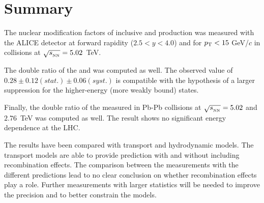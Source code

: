 \section{Summary}

The nuclear modification factors of inclusive \upsis and \upsiss production was measured with the ALICE detector at forward rapidity ($2.5<y<4.0$) and for $p_{\rm T}<15$ GeV/$c$ in \pbpb collisions at $\sqrt{s_{_{\rm NN}}}=5.02$~\rm{TeV}.

The double ratio of the \upsis and \upsiss \raa was computed as well. 
The observed value of $ 0.28 \pm 0.12(stat.) \pm 0.06(syst.)$ is compatible with the hypothesis of a larger suppression for the higher-energy (more weakly bound) states.

Finally, the double ratio of the \upsi \raa measured in Pb-Pb collisions at $\sqrt{s_{_{\rm NN}}}=5.02$ and $2.76$~\rm{TeV} was computed as well. 
The result shows no significant energy dependence at the LHC.


The results have been compared with transport and hydrodynamic models.
The transport models are able to provide prediction with and without including recombination effects.
The comparison between the measurements with the different predictions lead to no clear conclusion on whether recombination effects play a role.
Further measurements with larger statistics will be needed to improve the precision and to better constrain the models.